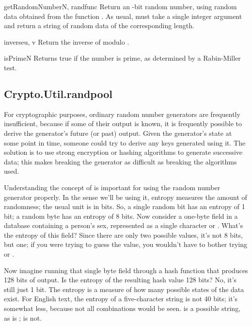 \documentclass{howto}
\begin{document}
\begin{funcdesc}{getRandomNumber}{N, randfunc}
Return an -bit random number, using random data obtained from the
function .  As usual,  must take a single
integer argument and return a string of random data of the
corresponding length.
\end{funcdesc}

\begin{funcdesc}{inverse}{u, v}
Return the inverse of  modulo .
\end{funcdesc}

\begin{funcdesc}{isPrime}{N}
Returns true if the number  is prime, as determined by a
Rabin-Miller test.
\end{funcdesc}


\subsection{Crypto.Util.randpool}

For cryptographic purposes, ordinary random number generators are
frequently insufficient, because if some of their output is known, it
is frequently possible to derive the generator's future (or past)
output.  Given the generator's state at some point in time, someone
could try to derive any keys generated using it.  The solution is to
use strong encryption or hashing algorithms to generate successive
data; this makes breaking the generator as difficult as breaking the
algorithms used.

Understanding the concept of  is important for using the
random number generator properly.  In the sense we'll be using it,
entropy measures the amount of randomness; the usual unit is in bits.
So, a single random bit has an entropy of 1 bit; a random byte has an
entropy of 8 bits.  Now consider a one-byte field in a database containing a
person's sex, represented as a single character  or .
What's the entropy of this field?  Since there are only two possible
values, it's not 8 bits, but one; if you were trying to guess the value,
you wouldn't have to bother trying  or .

Now imagine running that single byte field through a hash function that
produces 128 bits of output.  Is the entropy of the resulting hash value
128 bits?  No, it's still just 1 bit.  The entropy is a measure of how many
possible states of the data exist.  For English
text, the entropy of a five-character string is not 40 bits; it's
somewhat less, because not all combinations would be seen.  
is a possible string, as is ;  is not.
\end{document}
